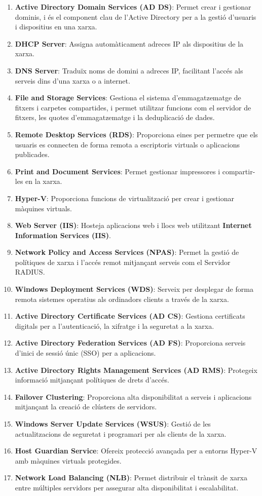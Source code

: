 \documentclass[
  a4paper,
]{article}
\begin{document}
\begin{enumerate}
\def\labelenumi{\arabic{enumi}.}
\item
  \textbf{Active Directory Domain Services (AD DS)}: Permet crear i
  gestionar dominis, i és el component clau de l'Active Directory per a
  la gestió d'usuaris i dispositius en una xarxa.
\item
  \textbf{DHCP Server}: Assigna automàticament adreces IP als
  dispositius de la xarxa.
\item
  \textbf{DNS Server}: Traduïx noms de domini a adreces IP, facilitant
  l'accés als serveis dins d'una xarxa o a internet.
\item
  \textbf{File and Storage Services}: Gestiona el sistema
  d'emmagatzematge de fitxers i carpetes compartides, i permet utilitzar
  funcions com el servidor de fitxers, les quotes d'emmagatzematge i la
  deduplicació de dades.
\item
  \textbf{Remote Desktop Services (RDS)}: Proporciona eines per permetre
  que els usuaris es connecten de forma remota a escriptoris virtuals o
  aplicacions publicades.
\item
  \textbf{Print and Document Services}: Permet gestionar impressores i
  compartir-les en la xarxa.
\item
  \textbf{Hyper-V}: Proporciona funcions de virtualització per crear i
  gestionar màquines virtuals.
\item
  \textbf{Web Server (IIS)}: Hosteja aplicacions web i llocs web
  utilitzant \textbf{Internet Information Services (IIS)}.
\item
  \textbf{Network Policy and Access Services (NPAS)}: Permet la gestió
  de polítiques de xarxa i l'accés remot mitjançant serveis com el
  Servidor RADIUS.
\item
  \textbf{Windows Deployment Services (WDS)}: Serveix per desplegar de
  forma remota sistemes operatius als ordinadors clients a través de la
  xarxa.
\item
  \textbf{Active Directory Certificate Services (AD CS)}: Gestiona
  certificats digitals per a l'autenticació, la xifratge i la seguretat
  a la xarxa.
\item
  \textbf{Active Directory Federation Services (AD FS)}: Proporciona
  serveis d'inici de sessió únic (SSO) per a aplicacions.
\item
  \textbf{Active Directory Rights Management Services (AD RMS)}:
  Protegeix informació mitjançant polítiques de drets d'accés.
\item
  \textbf{Failover Clustering}: Proporciona alta disponibilitat a
  serveis i aplicacions mitjançant la creació de clústers de servidors.
\item
  \textbf{Windows Server Update Services (WSUS)}: Gestió de les
  actualitzacions de seguretat i programari per als clients de la xarxa.
\item
  \textbf{Host Guardian Service}: Ofereix protecció avançada per a
  entorns Hyper-V amb màquines virtuals protegides.
\item
  \textbf{Network Load Balancing (NLB)}: Permet distribuir el trànsit de
  xarxa entre múltiples servidors per assegurar alta disponibilitat i
  escalabilitat.
\end{enumerate}
\end{document}
